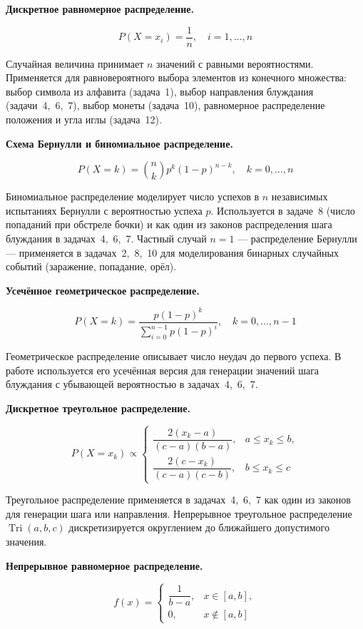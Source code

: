 \documentclass[14pt]{extarticle}
\begin{document}
\textbf{Дискретное равномерное распределение.}

$$P(X = x_i) = \frac{1}{n}, \quad i = 1, \ldots, n$$

Случайная величина принимает \(n\) значений с равными вероятностями. Применяется для равновероятного выбора элементов из конечного множества: выбор символа из алфавита (задача~1), выбор направления блуждания (задачи~4,~6,~7), выбор монеты (задача~10), равномерное распределение положения и угла иглы (задача~12).

\textbf{Схема Бернулли и биномиальное распределение.}

$$P(X = k) = \binom{n}{k} p^{k} (1-p)^{n-k}, \quad k = 0, \ldots, n$$

Биномиальное распределение моделирует число успехов в \(n\) независимых испытаниях Бернулли с вероятностью успеха \(p\). Используется в задаче~8 (число попаданий при обстреле бочки) и как один из законов распределения шага блуждания в задачах~4,~6,~7. Частный случай \(n = 1\) --- распределение Бернулли --- применяется в задачах~2,~8,~10 для моделирования бинарных случайных событий (заражение, попадание, орёл).

\textbf{Усечённое геометрическое распределение.}

$$P(X = k) = \frac{p(1-p)^k}{\sum_{i=0}^{n-1} p(1-p)^i}, \quad k = 0, \ldots, n-1$$

Геометрическое распределение описывает число неудач до первого успеха. В работе используется его усечённая версия для генерации значений шага блуждания с убывающей вероятностью в задачах~4,~6,~7.

\clearpage

\textbf{Дискретное треугольное распределение.}

$$P(X = x_k) \propto \begin{cases} \dfrac{2(x_k - a)}{(c-a)(b-a)}, & a \le x_k \le b, \\[6pt] \dfrac{2(c - x_k)}{(c-a)(c-b)}, & b \le x_k \le c \end{cases}$$

Треугольное распределение применяется в задачах~4,~6,~7 как один из законов для генерации шага или направления. Непрерывное треугольное распределение \(\operatorname{Tri}(a,b,c)\) дискретизируется округлением до ближайшего допустимого значения.

\textbf{Непрерывное равномерное распределение.}

$$f(x) = \begin{cases} \dfrac{1}{b-a}, & x \in [a, b], \\[6pt] 0, & x \notin [a, b] \end{cases}$$
\end{document}
